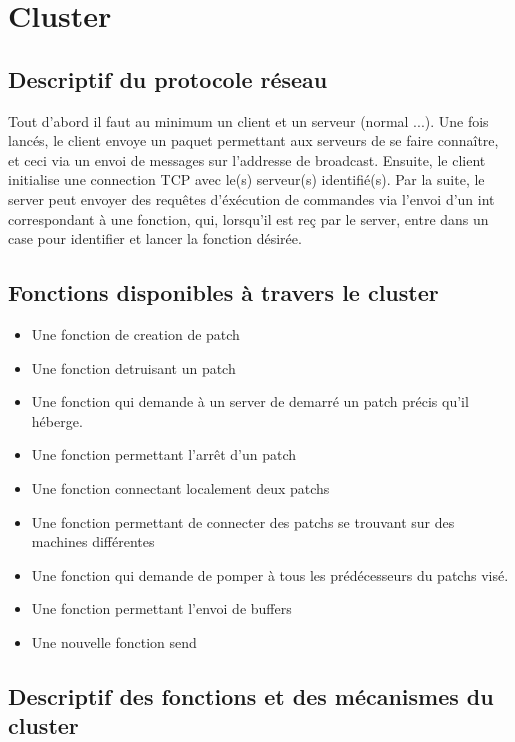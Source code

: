 \chapter{Cluster}

\section{Descriptif du protocole r\'eseau}
Tout d'abord il faut au minimum un client et un serveur (normal ...).
Une fois lanc\'es, le client envoye un paquet permettant aux serveurs de se 
faire conna\^itre, et ceci via un envoi de messages sur l'addresse de broadcast.
Ensuite, le client initialise une connection TCP avec le(s) serveur(s) 
identifi\'e(s).
Par la suite, le server peut envoyer des requ\^etes d'\'ex\'ecution de 
commandes via l'envoi d'un int correspondant \`a une fonction, qui, lorsqu'il
est re\c{c} par le server, entre dans un case pour identifier et lancer la 
fonction d\'esir\'ee.


\section{Fonctions disponibles \`a travers le cluster}
\begin{itemize}
\item Une fonction de creation de patch
\item Une fonction detruisant un patch
\item Une fonction qui demande \`a un server de demarr\'e un patch pr\'ecis
qu'il h\'eberge.
\item Une fonction permettant l'arr\^et d'un patch
\item Une fonction connectant localement deux patchs 
\item Une fonction permettant de connecter des patchs se trouvant sur des 
machines diff\'erentes
\item Une fonction qui demande de pomper \`a tous les pr\'ed\'ecesseurs du 
patchs vis\'e.
\item Une fonction permettant l'envoi de buffers
\item Une nouvelle fonction send
\end{itemize}

\newpage
\section{Descriptif des fonctions et des m\'ecanismes du cluster}

